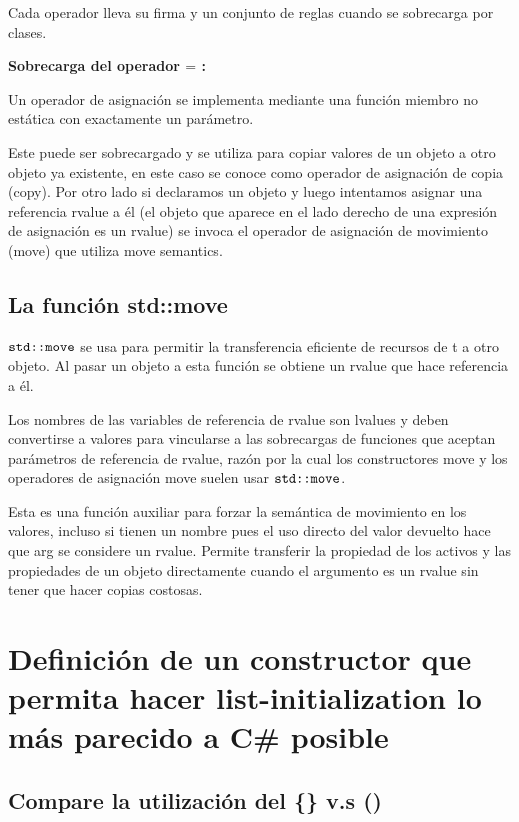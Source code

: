 \documentclass[10pt]{article}
\begin{document}
Cada operador lleva su firma y un conjunto de reglas cuando se sobrecarga por clases.

\vspace{0.5em}
\textbf{Sobrecarga del operador $ \textbf{=} $ :}

Un operador de asignación se implementa mediante una función miembro no estática con exactamente un parámetro.

Este puede ser sobrecargado y se utiliza para copiar valores de un objeto a otro objeto ya existente, en este caso se conoce como operador de asignaci\'on de copia (copy). Por otro lado si declaramos un objeto y luego intentamos asignar una referencia rvalue a él (el objeto que aparece en el lado derecho de una expresión de asignación es un rvalue) se invoca el operador de asignación de movimiento (move) que utiliza move semantics. 

\subsection{La funci\'on std::move}
	 $ \verb*|std::move| $ se usa para permitir la transferencia eficiente de recursos de t a otro objeto. Al pasar un objeto a esta función se obtiene un rvalue que hace referencia a él. 
	
	Los nombres de las variables de referencia de rvalue son lvalues y deben convertirse a valores para vincularse a las sobrecargas de funciones que aceptan parámetros de referencia de rvalue, razón por la cual los constructores move y los operadores de asignación move suelen usar $ \verb*|std::move| $.
	
	Esta es una función auxiliar para forzar la semántica de movimiento en los valores, incluso si tienen un nombre pues el uso directo del valor devuelto hace que arg se considere un rvalue. Permite transferir la propiedad de los activos y las propiedades de un objeto directamente cuando el argumento es un rvalue sin tener que hacer copias costosas.

\vspace{2em}
\section{Definici\'on de un constructor que permita hacer list-initialization lo más parecido a C\# posible}



\subsection{Compare la utilización del \{\} v.s ()}
\end{document}
